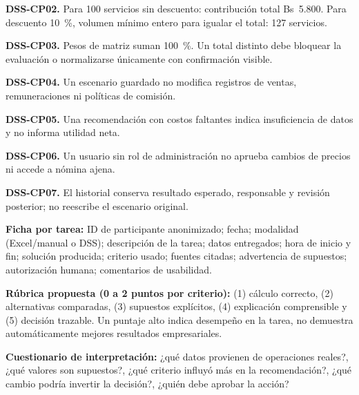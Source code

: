 \textbf{DSS-CP02.} Para 100 servicios sin descuento: contribución total Bs~5.800. Para descuento 10~\%, volumen mínimo entero para igualar el total: 127 servicios.


\textbf{DSS-CP03.} Pesos de matriz suman 100~\%. Un total distinto debe bloquear la evaluación o normalizarse únicamente con confirmación visible.


\textbf{DSS-CP04.} Un escenario guardado no modifica registros de ventas, remuneraciones ni políticas de comisión.


\textbf{DSS-CP05.} Una recomendación con costos faltantes indica insuficiencia de datos y no informa utilidad neta.


\textbf{DSS-CP06.} Un usuario sin rol de administración no aprueba cambios de precios ni accede a nómina ajena.


\textbf{DSS-CP07.} El historial conserva resultado esperado, responsable y revisión posterior; no reescribe el escenario original.



\textbf{Ficha por tarea:} ID de participante anonimizado; fecha; modalidad (Excel/manual o DSS); descripción de la tarea; datos entregados; hora de inicio y fin; solución producida; criterio usado; fuentes citadas; advertencia de supuestos; autorización humana; comentarios de usabilidad.


\textbf{Rúbrica propuesta (0 a 2 puntos por criterio):} (1) cálculo correcto, (2) alternativas comparadas, (3) supuestos explícitos, (4) explicación comprensible y (5) decisión trazable. Un puntaje alto indica desempeño en la tarea, no demuestra automáticamente mejores resultados empresariales.


\textbf{Cuestionario de interpretación:} ¿qué datos provienen de operaciones reales?, ¿qué valores son supuestos?, ¿qué criterio influyó más en la recomendación?, ¿qué cambio podría invertir la decisión?, ¿quién debe aprobar la acción?

